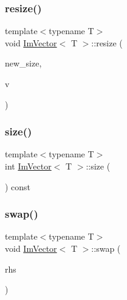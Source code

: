 \subsubsection{\texorpdfstring{resize()}{resize()}\hspace{0.1cm}{\footnotesize\ttfamily [2/2]}}
{\footnotesize\ttfamily template$<$typename T$>$ \\
void \mbox{\hyperlink{class_im_vector}{Im\+Vector}}$<$ T $>$\+::resize (\begin{DoxyParamCaption}\item[{int}]{new\+\_\+size,  }\item[{const \mbox{\hyperlink{class_im_vector_a8bd77e4e7581d8e5f9e98d7c2f3c2a80}{value\+\_\+type}} \&}]{v }\end{DoxyParamCaption})\hspace{0.3cm}{\ttfamily [inline]}}

\mbox{\label{class_im_vector_a8c903ecb1aaee0601b6a8ad835a4a435}} 
\subsubsection{\texorpdfstring{size()}{size()}}
{\footnotesize\ttfamily template$<$typename T$>$ \\
int \mbox{\hyperlink{class_im_vector}{Im\+Vector}}$<$ T $>$\+::size (\begin{DoxyParamCaption}{ }\end{DoxyParamCaption}) const\hspace{0.3cm}{\ttfamily [inline]}}

\mbox{\label{class_im_vector_ac7f0862107eb88349d17f9a2e147deaa}} 
\subsubsection{\texorpdfstring{swap()}{swap()}}
{\footnotesize\ttfamily template$<$typename T$>$ \\
void \mbox{\hyperlink{class_im_vector}{Im\+Vector}}$<$ T $>$\+::swap (\begin{DoxyParamCaption}\item[{\mbox{\hyperlink{class_im_vector}{Im\+Vector}}$<$ \mbox{\hyperlink{class_im_vector_a8bd77e4e7581d8e5f9e98d7c2f3c2a80}{value\+\_\+type}} $>$ \&}]{rhs }\end{DoxyParamCaption})\hspace{0.3cm}{\ttfamily [inline]}}

